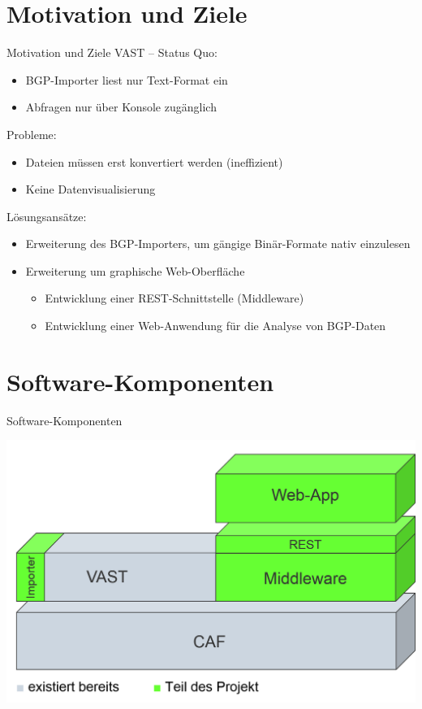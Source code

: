 \documentclass[9pt]{beamer}
\begin{document}
\section{Motivation und Ziele}

\begin{frame}{Motivation und Ziele}{}
   VAST -- Status Quo:
	\begin{itemize}
		\item BGP-Importer liest nur Text-Format ein
		\item Abfragen nur über Konsole zugänglich
		\end{itemize}
		\vspace{0,2cm}		
	Probleme:
		\begin{itemize}
		\item Dateien müssen erst konvertiert werden (ineffizient)
		\item Keine Datenvisualisierung
		\end{itemize}
		\vspace{0,2cm}
	Lösungsansätze:
		\begin{itemize}
			\item Erweiterung des BGP-Importers, um gängige Binär-Formate nativ 
			         einzulesen
			\item Erweiterung um graphische Web-Oberfläche
			\vspace{0,1cm}
		\begin{itemize}
			\item Entwicklung einer REST-Schnittstelle (Middleware)
			\item Entwicklung einer Web-Anwendung für die Analyse von BGP-Daten
		\end{itemize}
		\end{itemize}
\end{frame}

\section{Software-Komponenten}

\begin{frame}{Software-Komponenten}{}
	\begin{center}
		\includegraphics[width=1.0\textwidth]{res/software-komponenten.png}
	\end{center}
\end{frame}
\end{document}
